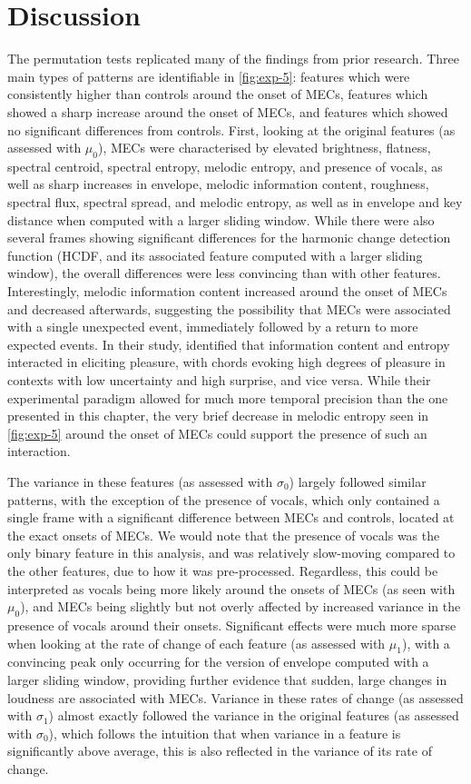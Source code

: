 \section{Discussion}

The permutation tests replicated many of the findings from prior research. Three main types of patterns are identifiable in \autoref{fig:exp-5}: features which were consistently higher than controls around the onset of MECs, features which showed a sharp increase around the onset of MECs, and features which showed no significant differences from controls. First, looking at the original features (as assessed with $\mu_0$), MECs were characterised by elevated brightness, flatness, spectral centroid, spectral entropy, melodic entropy, and presence of vocals, as well as sharp increases in envelope, melodic information content, roughness, spectral flux, spectral spread, and melodic entropy, as well as in envelope and key distance when computed with a larger sliding window. While there were also several frames showing significant differences for the harmonic change detection function (HCDF, and its associated feature computed with a larger sliding window), the overall differences were less convincing than with other features. Interestingly, melodic information content increased around the onset of MECs and decreased afterwards, suggesting the possibility that MECs were associated with a single unexpected event, immediately followed by a return to more expected events. In their study, \textcite{cheung2019} identified that information content and entropy interacted in eliciting pleasure, with chords evoking high degrees of pleasure in contexts with low uncertainty and high surprise, and vice versa. While their experimental paradigm allowed for much more temporal precision than the one presented in this chapter, the very brief decrease in melodic entropy seen in \autoref{fig:exp-5} around the onset of MECs could support the presence of such an interaction.

The variance in these features (as assessed with $\sigma_0$) largely followed similar patterns, with the exception of the presence of vocals, which only contained a single frame with a significant difference between MECs and controls, located at the exact onsets of MECs. We would note that the presence of vocals was the only binary feature in this analysis, and was relatively slow-moving compared to the other features, due to how it was pre-processed. Regardless, this could be interpreted as vocals being more likely around the onsets of MECs (as seen with $\mu_0$), and MECs being slightly but not overly affected by increased variance in the presence of vocals around their onsets. Significant effects were much more sparse when looking at the rate of change of each feature (as assessed with $\mu_1$), with a convincing peak only occurring for the version of envelope computed with a larger sliding window, providing further evidence that sudden, large changes in loudness are associated with MECs. Variance in these rates of change (as assessed with $\sigma_1$) almost exactly followed the variance in the original features (as assessed with $\sigma_0$), which follows the intuition that when variance in a feature is significantly above average, this is also reflected in the variance of its rate of change.

